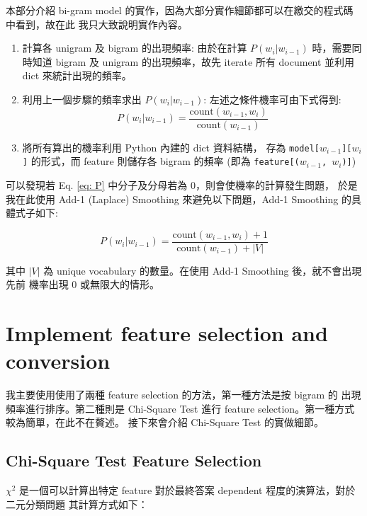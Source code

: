 \documentclass{article}[12pt]
\begin{document}
本部分介紹 bi-gram model 的實作，因為大部分實作細節都可以在繳交的程式碼中看到，故在此
我只大致說明實作內容。

\begin{enumerate}
    \item 計算各 unigram 及 bigram 的出現頻率: 由於在計算 $P(w_i|w_{i-1})$ 時，需要同時知道 bigram 及
    unigram 的出現頻率，故先 iterate 所有 document 並利用 dict 來統計出現的頻率。
    \item 利用上一個步驟的頻率求出 $P(w_i|w_{i-1})$: 左述之條件機率可由下式得到:
    \begin{equation}
        \label{eq: P}
        P(w_i|w_{i-1}) = \frac{\text{count}(w_{i-1}, w_i)}{\text{count}(w_{i-1})}
    \end{equation}
    \item 將所有算出的機率利用 Python 內建的 dict 資料結構，
    存為 \texttt{model[$w_{i-1}$][$w_i$]} 的形式，而 feature 則儲存各 bigram
    的頻率 (即為 \texttt{feature[($w_{i-1}$, $w_i$)]})
\end{enumerate}

可以發現若 Eq. \ref{eq: P} 中分子及分母若為 0，則會使機率的計算發生問題，
於是我在此使用 Add-1 (Laplace) Smoothing 來避免以下問題，Add-1 Smoothing 的具體式子如下:

\begin{equation}
    \label{eq: add-1}
    P(w_i|w_{i-1}) = \frac{\text{count}(w_{i-1}, w_i) + 1}{\text{count}(w_{i-1}) + |V|}
\end{equation}

其中 $|V|$ 為 unique vocabulary 的數量。在使用 Add-1 Smoothing 後，就不會出現先前
機率出現 0 或無限大的情形。

\section{Implement feature selection and conversion}

我主要使用使用了兩種 feature selection 的方法，第一種方法是按 bigram 的
出現頻率進行排序。第二種則是 Chi-Square Test 進行 feature selection。第一種方式較為簡單，在此不在贅述。
接下來會介紹 Chi-Square Test 的實做細節。

\subsection{Chi-Square Test Feature Selection}
$\chi^2$ 是一個可以計算出特定 feature 對於最終答案 dependent 程度的演算法，對於二元分類問題
其計算方式如下：
\end{document}
